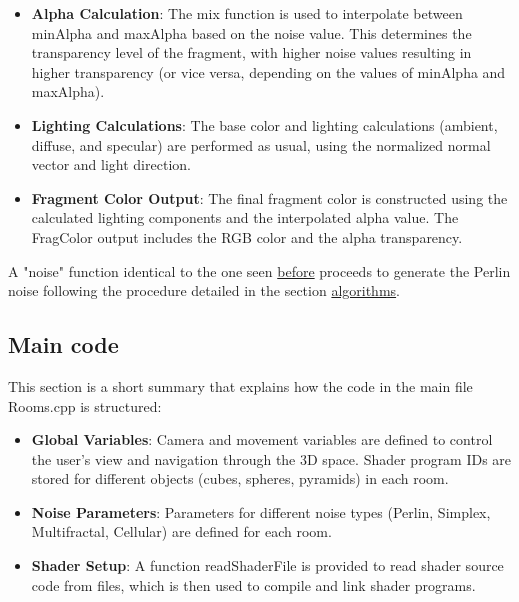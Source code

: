 \documentclass[12pt]{article}
\begin{document}
\begin{enumerate}
\begin {itemize}
        \item \textbf{Alpha Calculation}:
        \newline
        The mix function is used to interpolate between minAlpha and maxAlpha based on the noise value. 
        This determines the transparency level of the fragment, with higher noise values resulting in higher transparency (or vice versa, depending on the values of minAlpha and maxAlpha).

        \item \textbf{Lighting Calculations}:
        \newline
        The base color and lighting calculations (ambient, diffuse, and specular) are performed as usual, using the normalized normal vector and light direction.

        \item \textbf{Fragment Color Output}:
        \newline
        The final fragment color is constructed using the calculated lighting components and the interpolated alpha value. 
        The FragColor output includes the RGB color and the alpha transparency.
    \end{itemize}

    A "noise" function identical to the one seen \hyperref[img:noiseFunction]{before} proceeds to generate the Perlin noise following the procedure detailed in the section \hyperref[sec:algorithms]{algorithms}.

\subsection{Main code}
This section is a short summary that explains how the code in the main file Rooms.cpp is structured:

\begin{itemize}
    \item \textbf{Global Variables}:
    \newline
    Camera and movement variables are defined to control the user's view and navigation through the 3D space.
    Shader program IDs are stored for different objects (cubes, spheres, pyramids) in each room.

    \item \textbf{Noise Parameters}:
    \newline
    Parameters for different noise types (Perlin, Simplex, Multifractal, Cellular) are defined for each room.

    \item \textbf{Shader Setup}:
    \newline
    A function readShaderFile is provided to read shader source code from files, which is then used to compile and link shader programs.


\end{itemize}
\end{enumerate}
\end{document}
